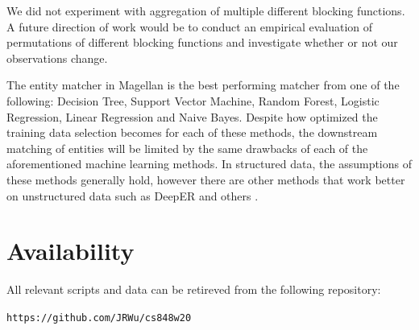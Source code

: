 \documentclass[letterpaper,twocolumn,10pt]{article}
\begin{document}
We did not experiment with aggregation of multiple different blocking functions. A future direction of work would be to conduct an empirical evaluation of permutations of different blocking functions and investigate whether or not our observations change. 

The entity matcher in Magellan is the best performing matcher from one of the following: Decision Tree, Support Vector Machine, Random Forest, Logistic Regression, Linear Regression and Naive Bayes. Despite how optimized the training data selection becomes for each of these methods, the downstream matching of entities will be limited by the same drawbacks of each of the aforementioned machine learning methods. In structured data, the assumptions of these methods generally hold, however there are other methods that work better on unstructured data such as DeepER and others \cite{ebraheem2017deeper, mudgal2018deep}.


\section{Availability}\label{Availability}
All relevant scripts and data can be retireved from the following repository:
\begin{center}
{\tt https://github.com/JRWu/cs848w20}
\end{center}



{\footnotesize 

\theendnotes

\newpage
}
\end{document}
